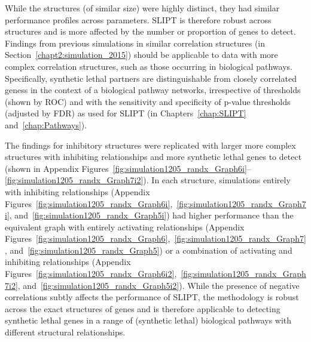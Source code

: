 While the  structures (of similar size) were highly distinct, they had similar performance profiles across parameters. \gls{SLIPT} is therefore robust across  structures and is more affected by the number or proportion of genes to detect. Findings from previous simulations in similar correlation structures (in Section~\ref{chapt2:simulation_2015}) should be applicable to  data with more complex correlation structures, such as those occurring in biological pathways. Specifically, \gls{synthetic lethal} partners are distinguishable from closely correlated geness in the context of a biological pathway networks, irrespective of thresholds (shown by \gls{ROC}) and with the sensitivity and specificity of p-value thresholds (adjusted by \gls{FDR}) as used for \gls{SLIPT} (in Chapters~\ref{chap:SLIPT} and~\ref{chap:Pathways}).



The findings for inhibitory  structures were replicated with larger more complex  structures with inhibiting relationships and more \gls{synthetic lethal} genes to detect (shown in Appendix Figures~\ref{fig:simulation1205_randx_Graph6i}\nobreakdash--\ref{fig:simulation1205_randx_Graph7i2}). In each  structure, simulations entirely with inhibiting relationships (Appendix Figures~\ref{fig:simulation1205_randx_Graph6i},~\ref{fig:simulation1205_randx_Graph7i}, and~\ref{fig:simulation1205_randx_Graph5i}) had higher performance than the equivalent graph with entirely activating relationships (Appendix Figures~\ref{fig:simulation1205_randx_Graph6},~\ref{fig:simulation1205_randx_Graph7}, and~\ref{fig:simulation1205_randx_Graph5}) or a combination of activating and inhibiting relationships (Appendix Figures~\ref{fig:simulation1205_randx_Graph6i2},~\ref{fig:simulation1205_randx_Graph7i2}, and~\ref{fig:simulation1205_randx_Graph5i2}). 
While the presence of negative correlations subtly affects the performance of \gls{SLIPT}, the methodology is robust across the exact structures of genes and is therefore applicable to detecting \gls{synthetic lethal} genes in a range of (synthetic lethal) biological pathways with different structural relationships.

